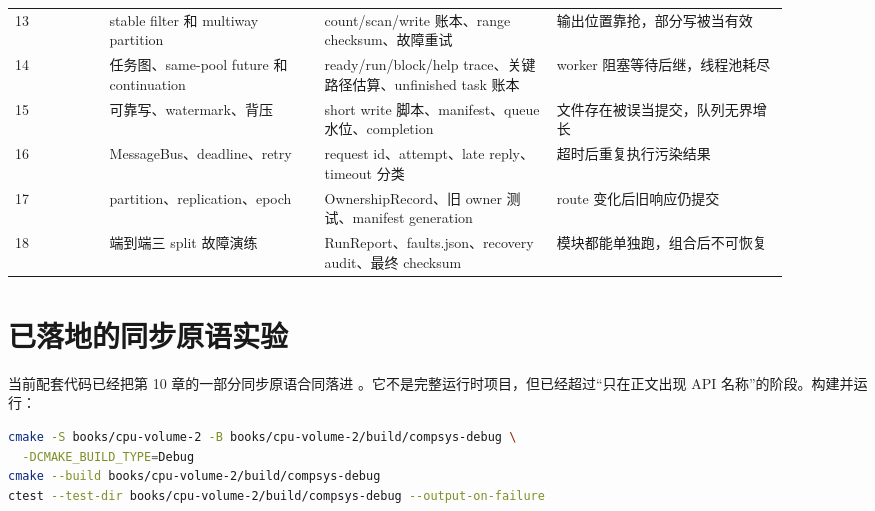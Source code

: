 \begin{longtable}{@{}p{0.11\linewidth}p{0.25\linewidth}p{0.27\linewidth}p{0.27\linewidth}@{}}
13 & stable filter 和 multiway partition & count/scan/write 账本、range checksum、故障重试 & 输出位置靠抢，部分写被当有效 \\
14 & 任务图、same-pool future 和 continuation & ready/run/block/help trace、关键路径估算、unfinished task 账本 & worker 阻塞等待后继，线程池耗尽 \\
15 & 可靠写、watermark、背压 & short write 脚本、manifest、queue 水位、completion & 文件存在被误当提交，队列无界增长 \\
16 & MessageBus、deadline、retry & request id、attempt、late reply、timeout 分类 & 超时后重复执行污染结果 \\
17 & partition、replication、epoch & OwnershipRecord、旧 owner 测试、manifest generation & route 变化后旧响应仍提交 \\
18 & 端到端三 split 故障演练 & RunReport、faults.json、recovery audit、最终 checksum & 模块都能单独跑，组合后不可恢复 \\
\bottomrule
\end{longtable}

\section{已落地的同步原语实验}

当前配套代码已经把第 10 章的一部分同步原语合同落进 。它不是完整运行时项目，但已经超过“只在正文出现 API 名称”的阶段。构建并运行：

\begin{lstlisting}[language=bash,caption={第二册同步实验的 CTest 入口}]
cmake -S books/cpu-volume-2 -B books/cpu-volume-2/build/compsys-debug \
  -DCMAKE_BUILD_TYPE=Debug
cmake --build books/cpu-volume-2/build/compsys-debug
ctest --test-dir books/cpu-volume-2/build/compsys-debug --output-on-failure
\end{lstlisting}

